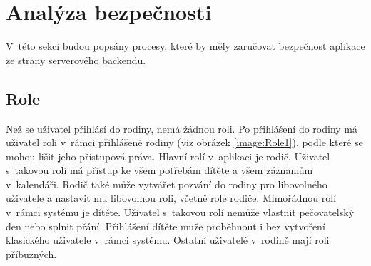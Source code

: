             

\section{Analýza bezpečnosti}
    V~této sekci budou popsány procesy, které by měly zaručovat bezpečnost aplikace ze strany serverového backendu.
    
    \subsection{Role}\label{analyza:bezpecnost:role}
    
        Než se uživatel přihlásí do rodiny, nemá žádnou roli. Po přihlášení do rodiny má uživatel roli v~rámci přihlášené rodiny (viz obrázek \ref{image:Role1}), podle které se mohou lišit jeho přístupová práva. Hlavní rolí v~aplikaci je rodič. Uživatel s~takovou rolí má přístup ke všem potřebám dítěte a všem záznamům v~kalendáři. Rodič také může vytvářet pozvání do rodiny pro libovolného uživatele a nastavit mu libovolnou roli, včetně role rodiče. Mimořádnou rolí v~rámci systému je dítěte. 
        Uživatel s~takovou rolí nemůže vlastnit pečovatelský den nebo splnit přání. Přihlášení dítěte muže proběhnout i bez vytvoření klasického uživatele v~rámci systému. Ostatní uživatelé v~rodině mají roli příbuzných. 
    
